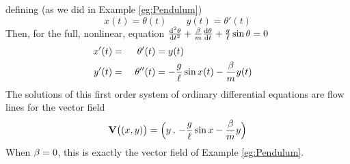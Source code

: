 defining (as we did in Example \ref{eg:Pendulum})
\begin{equation*}
x(t)=\theta(t)\qquad y(t)=\theta'(t)
\end{equation*}
Then, for the full, nonlinear, equation 
$ \difftwo{\theta}{t}+\frac{\be}{m}\diff{\theta}{t}
+\frac{g}{\ell}\sin\theta=0$
\begin{alignat*}{3}
x'(t)&=&\theta'(t)&=y(t)\cr
y'(t)&=&\ \theta''(t)&=-\frac{g}{\ell}\sin x(t)-\frac{\beta}{m} y(t)
\end{alignat*}
The solutions of this first order system of ordinary differential equations
are flow lines for the vector field
\begin{equation*}
\mathbf{V}\big((x,y)\big)=\Big(y\,,\,-\frac{g}{\ell}\sin x-\frac{\beta}{m} y\Big)
\end{equation*}
When $\beta=0$, this is exactly the vector field of Example \ref{eg:Pendulum}.











